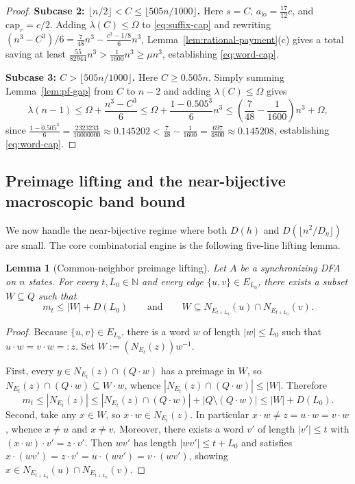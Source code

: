 \documentclass[11pt]{article}
\newtheorem{lemma}[theorem]{Lemma}
\theoremstyle{definition}
\theoremstyle{remark}
\newcommand{\N}{\mathbb{N}}
\begin{document}
\begin{proof}
\smallskip
\noindent\textbf{Subcase 2: $\lfloor n/2 \rfloor < C \le \lfloor 505 n / 1000 \rfloor$.}
Here $s = C$, $a_{\mathrm{lo}} = \frac{17}{12} c$, and $\mathrm{cap}_r = c / 2$. Adding $\lambda(C) \le \Omega$ to \eqref{eq:suffix-cap} and rewriting $(n^3 - C^3)/6 = \frac{7}{48} n^3 - \frac{c^3 - 1/8}{6} n^3$, Lemma~\ref{lem:rational-payment}(c) gives a total saving at least $\frac{55}{82944} n^3 > \frac{1}{1600} n^3 \ge \mu n^3$, establishing \eqref{eq:word-cap}.

\smallskip
\noindent\textbf{Subcase 3: $C > \lfloor 505 n / 1000 \rfloor$.}
Here $C \ge 0.505 n$. Simply summing Lemma~\ref{lem:pf-gap} from $C$ to $n - 2$ and adding $\lambda(C) \le \Omega$ gives
\[
  \lambda(n - 1) \le \Omega + \frac{n^3 - C^3}{6} \le \Omega + \frac{1 - 0.505^3}{6} n^3
  \le \left(\frac{7}{48} - \frac{1}{1600}\right) n^3 + \Omega,
\]
since $\frac{1 - 0.505^3}{6} = \frac{2323233}{16000000} \approx 0.145202 < \frac{7}{48} - \frac{1}{1600} = \frac{697}{4800} \approx 0.145208$, establishing \eqref{eq:word-cap}.
\end{proof}

\subsection{Preimage lifting and the near-bijective macroscopic band bound}\label{sec:caseB}

We now handle the near-bijective regime where both $D(h)$ and $D(\lfloor n^2/D_\eta \rfloor)$ are small. The core combinatorial engine is the following five-line lifting lemma.

\begin{lemma}[Common-neighbor preimage lifting]\label{lem:preimage-lift}
Let $A$ be a synchronizing DFA on $n$ states. For every $t, L_0 \in \N$ and every edge $\{u, v\} \in E_{L_0}$, there exists a subset $W \subseteq Q$ such that
\[
  m_t \le |W| + D(L_0) \qquad\text{and}\qquad W \subseteq N_{E_{t + L_0}}(u) \cap N_{E_{t + L_0}}(v).
\]
\end{lemma}

\begin{proof}
Because $\{u, v\} \in E_{L_0}$, there is a word $w$ of length $|w| \le L_0$ such that $u \cdot w = v \cdot w =: z$. Set $W := (N_{E_t}(z)) w^{-1}$.

First, every $y \in N_{E_t}(z) \cap (Q \cdot w)$ has a preimage in $W$, so $N_{E_t}(z) \cap (Q \cdot w) \subseteq W \cdot w$, whence $|N_{E_t}(z) \cap (Q \cdot w)| \le |W|$. Therefore
\[
  m_t \le |N_{E_t}(z)| \le |N_{E_t}(z) \cap (Q \cdot w)| + |Q \setminus (Q \cdot w)| \le |W| + D(L_0).
\]
Second, take any $x \in W$, so $x \cdot w \in N_{E_t}(z)$. In particular $x \cdot w \ne z = u \cdot w = v \cdot w$, whence $x \ne u$ and $x \ne v$. Moreover, there exists a word $v'$ of length $|v'| \le t$ with $(x \cdot w) \cdot v' = z \cdot v'$. Then $w v'$ has length $|w v'| \le t + L_0$ and satisfies $x \cdot (wv') = z \cdot v' = u \cdot (wv') = v \cdot (wv')$, showing $x \in N_{E_{t+L_0}}(u) \cap N_{E_{t+L_0}}(v)$.
\end{proof}
\end{document}
